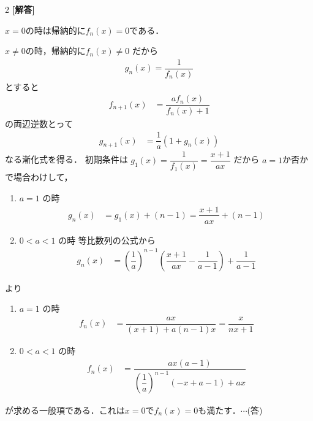 \documentclass[../../main.tex]{subfiles}
\begin{document}
\setcounter{equation}{0}
\begin{oframed}
  
\end{oframed}
\setlength{\columnseprule}{0.4pt}
\begin{multicols}{2}
  {\bf [解答]}


  $x=0$の時は帰納的に$f_n(x) = 0$である．

  $x \neq 0$の時，帰納的に$f_n(x) \neq 0$ だから
  \begin{align}
    g_n(x) = \dfrac{1}{f_n(x)}
  \end{align}
  とすると
  \begin{align}
    f_{n+1}(x) & = \dfrac{af_n(x)}{f_n(x)+1}
  \end{align}
  の両辺逆数とって
  \begin{align}
    g_{n+1}(x) & = \dfrac{1}{a} (1+g_n(x))
  \end{align}
  なる漸化式を得る．
  初期条件は $g_1(x) = \dfrac{1}{f_1(x)} = \dfrac{x+1}{ax}$ だから
  $a=1$か否かで場合わけして，
  \begin{enumerate}
    \item[$1^\circ$] $a=1$ の時
      \begin{align}
        g_n(x) & = g_1(x) + (n-1) = \dfrac{x+1}{ax} + (n-1)
      \end{align}
    \item[$2^\circ$] $0<a<1$ の時
      等比数列の公式から
      \begin{align}
        g_n(x)
        & = \left(\dfrac{1}{a}\right)^{n-1} \left(\dfrac{x+1}{ax} - \dfrac{1}{a-1}\right) + \dfrac{1}{a-1}
      \end{align}
  \end{enumerate}
  より
  \begin{enumerate}
    \item[$1^\circ$] $a=1$ の時
      \begin{align}
        f_n(x) & = \dfrac{ax}{(x+1)+a(n-1)x} = \dfrac{x}{nx+1}
      \end{align}
    \item[$2^\circ$] $0<a<1$ の時
      \begin{align}
        f_n(x) & = \dfrac{ax(a-1)}{\left(\dfrac{1}{a}\right)^{n-1} (-x+a-1) + ax}
      \end{align}
  \end{enumerate}
  が求める一般項である．これは$x=0$で$f_n(x)=0$も満たす．$\cdots$(答)


\end{multicols}
\end{document}
